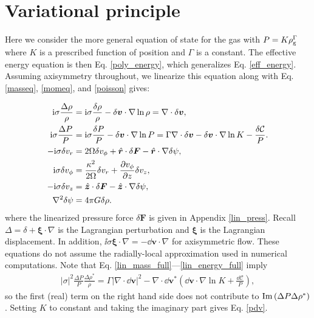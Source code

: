 \section{Variational principle}\label{var_prin}

Here we consider the more general equation of state for the gas with
$P = K \rho_\mathrm{g}^{\Gamma}$ where $K$ is a prescribed function of position
and $\Gamma$ is a constant. The effective energy equation is then
Eq. \ref{poly_energy}, which generalizes
Eq. \ref{eff_energy}. Assuming axisymmetry throughout, we linearize this equation along with Eq. \ref{masseq},  
\ref{momeq},  and \ref{poisson} gives:  


\begin{align}
 \mathrm{i}\sigma\frac{\Delta\rho}{\rho} &= \mathrm{i}\sigma\frac{\delta\rho}{\rho} - 
  \delta\bm{v}\cdot\nabla\ln{\rho} =  \nabla\cdot\delta\bm{v},\label{lin_mass_full}\\
  \mathrm{i}\sigma\frac{\Delta P}{P} &= \mathrm{i}\sigma\frac{\delta P}{P} -
  \delta\bm{v}\cdot\nabla\ln{P} = 
\Gamma \nabla\cdot\delta\bm{v}  - \delta\bm{v}\cdot\nabla\ln{K} - \frac{\delta\mathcal{C}}{P}.\label{lin_energy_full}\\
  -\mathrm{i}\sigma\delta v_r  &= 2\Omega\delta v_\phi + 
  \hat{\bm{r}} \cdot \delta\bm{F} -  \hat{\bm{r}} \cdot \nabla\delta\psi ,\\
  \mathrm{i}\sigma\delta v_\phi &= \frac{\kappa^2}{2\Omega}\delta v_r + \frac{\partial
    v_\phi}{\partial z}\delta v_z,\\
  -\mathrm{i}\sigma\delta v_z &=  \hat{\bm{z}} \cdot \delta\bm{F}  -  \hat{\bm{z}} \cdot \nabla\delta\psi, \\ 
\nabla^2 \delta\psi & = 4\pi G \delta\rho. 
\end{align}  
where the linearized pressure force $\delta \bm{F}$ is given in
Appendix \ref{lin_press}. Recall $\Delta = \delta +
\bm{\xi}\cdot\nabla$ is the Lagrangian perturbation and $\bm{\xi}$ is the
Lagrangian displacement. In addition, 
$\ii\sigma\bm{\xi}\cdot\nabla = -\dd\bm{v}\cdot\nabla$ for axisymmetric flow.  These equations do not assume the
radially-local approximation used in numerical computations. Note that
Eq. \ref{lin_mass_full}---\ref{lin_energy_full} imply 
\begin{align}
\left|\sigma\right|^2\frac{\Delta P}{P}\frac{\Delta \rho^*}{\rho} =
\Gamma\left|\nabla\cdot\dd\bm{v}\right|^2 -
\nabla\cdot\dd\bm{v}^*\left(\dd\bm{v}\cdot\nabla\ln{K} + \frac{\dd\mathcal{C}}{P}\right),
\end{align}
so the first (real) term on the right hand side does not contribute to
$\operatorname{Im}{\left(\Delta P\Delta\rho^*\right)}$. Setting $K$ to constant
and taking the imaginary part gives Eq. \ref{pdv}. 

